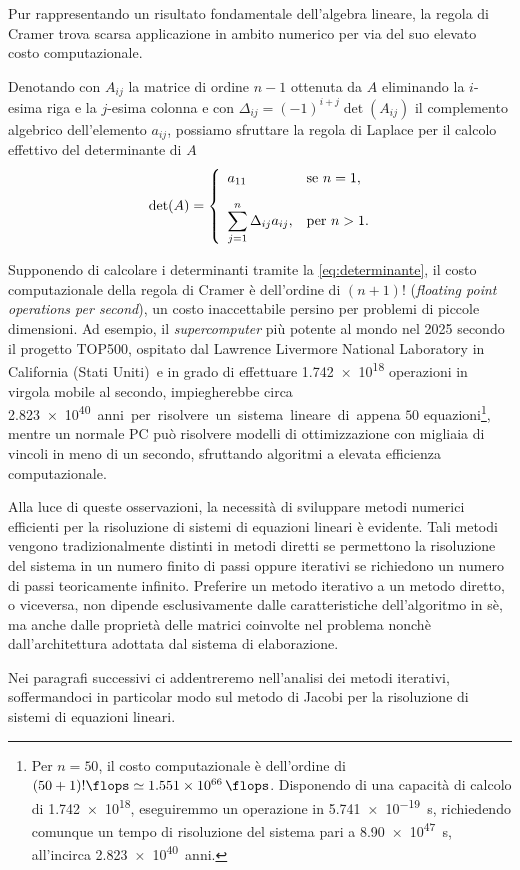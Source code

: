 Pur rappresentando un risultato fondamentale dell'algebra lineare, la regola di Cramer trova scarsa applicazione in ambito numerico per via del suo elevato
costo computazionale.

Denotando con $A_{ij}$ la matrice di ordine $n-1$ ottenuta da $A$ eliminando la $i$-esima riga e la $j$-esima colonna e con
$\Delta_{ij} = (-1)^{i+j}\det{(A_{ij})}$ il complemento algebrico dell'elemento $a_{ij}$, possiamo sfruttare la regola di Laplace per il calcolo effettivo del
determinante di $A$
\begin{equation}
    \label{eq:determinante}
    \det(A) =
    \begin{cases}
        \hspace{0.5em} a_{11}                                   & \text{se } n=1,  \\[1em]
        \hspace{0.5em} \displaystyle\sum_{j=1}^{n} \Delta_{ij}a_{ij}, & \text{per } n>1.
    \end{cases}
\end{equation}

Supponendo di calcolare i determinanti tramite la \eqref{eq:determinante}, il costo computazionale della regola di Cramer \`e
dell'ordine di $(n+1)!$ \si{\flops} (\textit{floating point operations per second}), un costo inaccettabile persino per problemi di
piccole dimensioni.\newline
Ad esempio, il \textit{supercomputer} pi\`u potente al mondo nel 2025 secondo il progetto TOP500, ospitato dal
Lawrence Livermore National Laboratory in California (Stati Uniti)\,\cite{Thomas2024} e in grado di effettuare \num{1.742e18} operazioni in virgola mobile al 
secondo, impiegherebbe circa \SI{2.823e40} anni per risolvere un sistema
lineare di appena $50$ equazioni\footnote{Per $n=50$, il costo computazionale \`e dell'ordine di
    $(50+1)!\si{\flops} \simeq \SI{1.551e66}{\flops}$.\newline
    Disponendo di una capacit\`a di calcolo di \SI{1.742e18}{\flops}, eseguiremmo un operazione in \SI{5.741e-19}{s}, richiedendo
    comunque un tempo di risoluzione del sistema pari a \SI{8.90e47}{s}, all'incirca \SI{2.823e40}{anni}.}, mentre un normale PC pu\`o risolvere modelli di ottimizzazione con migliaia
di vincoli in meno di un secondo, sfruttando algoritmi a elevata efficienza computazionale.

Alla luce di queste osservazioni, la necessit\`a di sviluppare metodi numerici efficienti per la risoluzione di sistemi di
equazioni lineari \`e evidente.\newline
Tali metodi vengono tradizionalmente distinti in metodi
diretti se permettono la risoluzione del sistema in un numero finito di passi oppure iterativi se richiedono un numero di passi
teoricamente infinito.\newline
Preferire un metodo iterativo a un metodo diretto, o viceversa, non dipende esclusivamente dalle caratteristiche dell'algoritmo in s\`e, ma anche dalle propriet\`a delle matrici coinvolte nel problema nonch\`e dall'architettura adottata dal sistema di elaborazione.

Nei paragrafi successivi ci addentreremo nell'analisi dei metodi iterativi, soffermandoci in particolar modo sul metodo di Jacobi per la risoluzione di sistemi di equazioni lineari.

